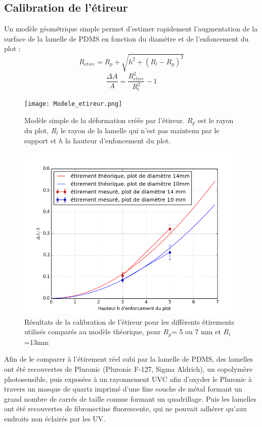 	\subsection{Calibration de l'étireur}
	
	Un modèle géométrique simple permet d'estimer rapidement l'augmentation de la surface de la lamelle de PDMS en fonction du diamètre et de l'enfoncement du plot : 
	$$R_{etire}=R_p+\sqrt{h^2+(R_l-R_p)^2}$$
	$$ \frac{\Delta A}{A} = \frac{R_{etire}^2}{R_l^2}-1$$ 	
		
	\begin{figure}[h!]
		\texttt{[image: Modele\_etireur.png]}
		\caption{Modèle simple de la déformation créée par l'étireur. $R_p$ est le rayon du plot, $R_l$ le rayon de la lamelle qui n'est pas maintenu par le support et $h$ la hauteur d'enfoncement du plot.}
		\end{figure}	
		
		\begin{figure}
		\includegraphics[scale=0.5]{Figures/Calibration_etireur.png} 
		\caption{Résultats de la calibration de l'étireur pour les différents étirements utilisés comparés au modèle théorique, pour $R_p$= 5 ou 7 mm et $R_l$=13mm}
		\end{figure}
	Afin de le comparer à l'étirement réel subi par la lamelle de PDMS, des lamelles ont été recouvertes de Pluronic (Pluronic F-127, Sigma Aldrich), un copolymère photosensible, puis exposées à un rayonnement UVC afin d'oxyder le Pluronic à travers un masque de quartz imprimé d'une fine couche de métal formant un grand nombre de carrés de taille connue formant un quadrillage. Puis les lamelles ont été recouvertes de fibronectine fluorescente, qui ne pouvait adhérer qu'aux endroits non éclairés par les UV. 
	
